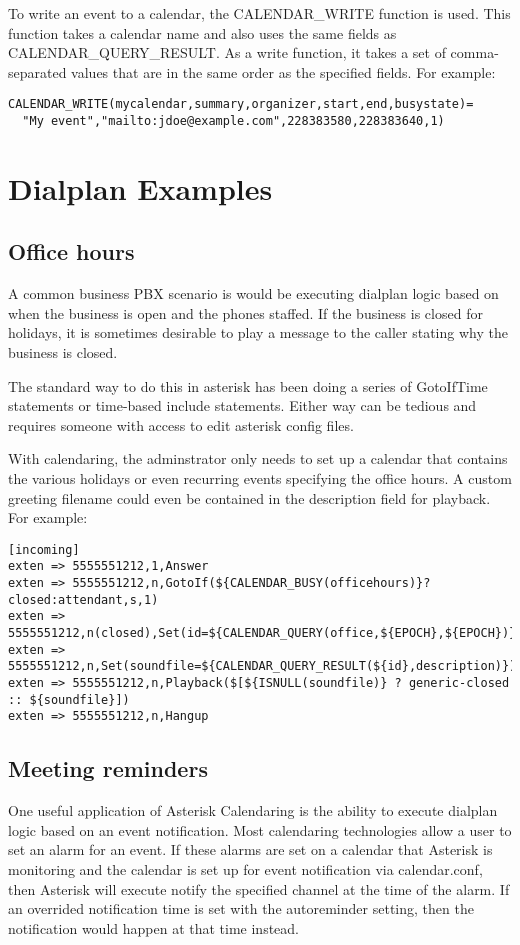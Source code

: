 To write an event to a calendar, the CALENDAR\_WRITE function is used. This
function takes a calendar name and also uses the same fields as
CALENDAR\_QUERY\_RESULT. As a write function, it takes a set of comma-separated
values that are in the same order as the specified fields. For example:
\begin{astlisting}
\begin{verbatim}
CALENDAR_WRITE(mycalendar,summary,organizer,start,end,busystate)=
  "My event","mailto:jdoe@example.com",228383580,228383640,1)
\end{verbatim}
\end{astlisting}

\section{Dialplan Examples}
\subsection{Office hours}
A common business PBX scenario is would be executing dialplan logic based on
when the business is open and the phones staffed. If the business is closed for
holidays, it is sometimes desirable to play a message to the caller stating why
the business is closed.

The standard way to do this in asterisk has been doing a series of GotoIfTime
statements or time-based include statements. Either way can be tedious and
requires someone with access to edit asterisk config files.

With calendaring, the adminstrator only needs to set up a calendar that contains
the various holidays or even recurring events specifying the office hours. A
custom greeting filename could even be contained in the description field for
playback. For example:
\begin{astlisting}
\begin{verbatim}
[incoming]
exten => 5555551212,1,Answer
exten => 5555551212,n,GotoIf(${CALENDAR_BUSY(officehours)}?closed:attendant,s,1)
exten => 5555551212,n(closed),Set(id=${CALENDAR_QUERY(office,${EPOCH},${EPOCH})})
exten => 5555551212,n,Set(soundfile=${CALENDAR_QUERY_RESULT(${id},description)})
exten => 5555551212,n,Playback($[${ISNULL(soundfile)} ? generic-closed :: ${soundfile}])
exten => 5555551212,n,Hangup
\end{verbatim}
\end{astlisting}

\subsection{Meeting reminders}
One useful application of Asterisk Calendaring is the ability to execute
dialplan logic based on an event notification. Most calendaring technologies
allow a user to set an alarm for an event. If these alarms are set on a calendar
that Asterisk is monitoring and the calendar is set up for event notification
via calendar.conf, then Asterisk will execute notify the specified channel at
the time of the alarm. If an overrided notification time is set with the
autoreminder setting, then the notification would happen at that time instead.

